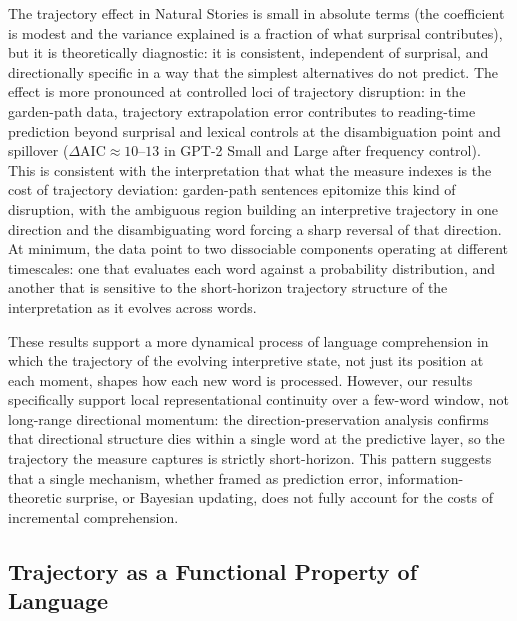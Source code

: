 \documentclass[12pt]{article}
\begin{document}
The trajectory effect in Natural Stories is small in absolute terms (the coefficient is modest and the variance explained is a fraction of what surprisal contributes), but it is theoretically diagnostic: it is consistent, independent of surprisal, and directionally specific in a way that the simplest alternatives do not predict. The effect is more pronounced at controlled loci of trajectory disruption: in the garden-path data, trajectory extrapolation error contributes to reading-time prediction beyond surprisal and lexical controls at the disambiguation point and spillover ($\Delta\text{AIC} \approx 10\text{--}13$ in GPT-2 Small and Large after frequency control). This is consistent with the interpretation that what the measure indexes is the cost of trajectory deviation: garden-path sentences epitomize this kind of disruption, with the ambiguous region building an interpretive trajectory in one direction and the disambiguating word forcing a sharp reversal of that direction. At minimum, the data point to two dissociable components operating at different timescales: one that evaluates each word against a probability distribution, and another that is sensitive to the short-horizon trajectory structure of the interpretation as it evolves across words.

These results support a more dynamical process of language comprehension in which the trajectory of the evolving interpretive state, not just its position at each moment, shapes how each new word is processed. However, our results specifically support local representational continuity over a few-word window, not long-range directional momentum: the direction-preservation analysis confirms that directional structure dies within a single word at the predictive layer, so the trajectory the measure captures is strictly short-horizon. This pattern suggests that a single mechanism, whether framed as prediction error, information-theoretic surprise, or Bayesian updating, does not fully account for the costs of incremental comprehension.

\subsection{Trajectory as a Functional Property of Language}
\end{document}

